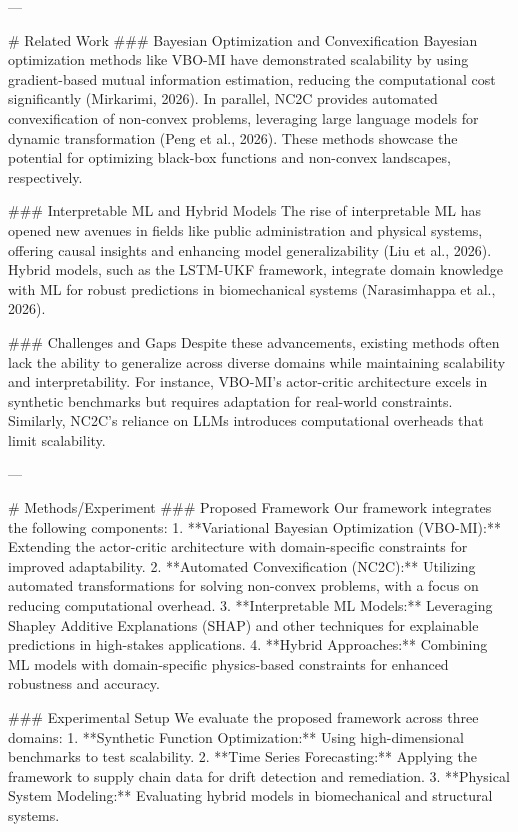 ---

# Related Work  
### Bayesian Optimization and Convexification  
Bayesian optimization methods like VBO-MI have demonstrated scalability by using gradient-based mutual information estimation, reducing the computational cost significantly (Mirkarimi, 2026). In parallel, NC2C provides automated convexification of non-convex problems, leveraging large language models for dynamic transformation (Peng et al., 2026). These methods showcase the potential for optimizing black-box functions and non-convex landscapes, respectively.

### Interpretable ML and Hybrid Models  
The rise of interpretable ML has opened new avenues in fields like public administration and physical systems, offering causal insights and enhancing model generalizability (Liu et al., 2026). Hybrid models, such as the LSTM-UKF framework, integrate domain knowledge with ML for robust predictions in biomechanical systems (Narasimhappa et al., 2026).

### Challenges and Gaps  
Despite these advancements, existing methods often lack the ability to generalize across diverse domains while maintaining scalability and interpretability. For instance, VBO-MI's actor-critic architecture excels in synthetic benchmarks but requires adaptation for real-world constraints. Similarly, NC2C's reliance on LLMs introduces computational overheads that limit scalability.

---

# Methods/Experiment  
### Proposed Framework  
Our framework integrates the following components:  
1. **Variational Bayesian Optimization (VBO-MI):** Extending the actor-critic architecture with domain-specific constraints for improved adaptability.  
2. **Automated Convexification (NC2C):** Utilizing automated transformations for solving non-convex problems, with a focus on reducing computational overhead.  
3. **Interpretable ML Models:** Leveraging Shapley Additive Explanations (SHAP) and other techniques for explainable predictions in high-stakes applications.  
4. **Hybrid Approaches:** Combining ML models with domain-specific physics-based constraints for enhanced robustness and accuracy.  

### Experimental Setup  
We evaluate the proposed framework across three domains:  
1. **Synthetic Function Optimization:** Using high-dimensional benchmarks to test scalability.  
2. **Time Series Forecasting:** Applying the framework to supply chain data for drift detection and remediation.  
3. **Physical System Modeling:** Evaluating hybrid models in biomechanical and structural systems.

